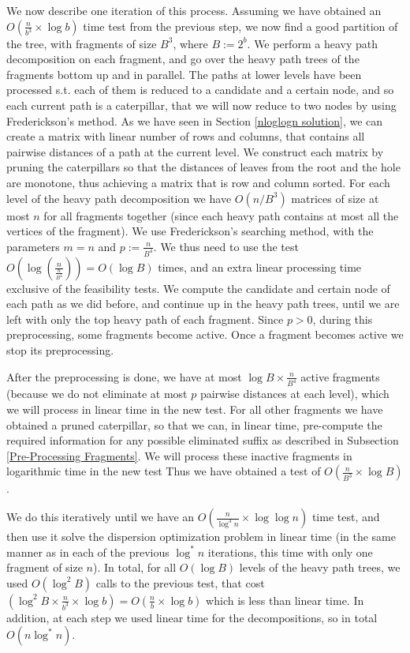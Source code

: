 \documentclass[11pt,a4paper]{article}
\theoremstyle{definition}
\theoremstyle{remark}
\begin{document}
We now describe one iteration of this process. Assuming we have obtained an $O(\frac{n}{b^3} \times \log b)$ time test from the previous step, we now find a good partition of the tree, with fragments of size $B^3$, where $B:=2^b$. We perform a heavy path decomposition on each fragment, and go over the heavy path trees of the fragments bottom up and in parallel. The paths at lower levels have been processed s.t. each of them is reduced to a candidate and a certain node, and so each current path is a caterpillar, that we will now reduce to two nodes by using Frederickson's method. As we have seen in Section \ref{nloglogn solution}, we can create a matrix with linear number of rows and columns, that contains all pairwise distances of a path at the current level. We construct each matrix by pruning the caterpillars so that the distances of leaves from the root and the hole are monotone, thus achieving a matrix that is row and column sorted. For each level of the heavy path decomposition we have $O(n/B^3)$ matrices of size at most $n$ for all fragments together (since each heavy path contains at most all the vertices of the fragment). We use Frederickson's searching method, with the parameters $m=n$ and $p:=\frac{n}{B^4}$. We thus need to use the test $O(\log (\frac{n}{\frac{n}{B^4}}))=O(\log B)$ times, and an extra linear processing time exclusive of the feasibility tests. We compute the candidate and certain node of each path as we did before, and continue up in the heavy path trees, until we are left with only the top heavy path of each fragment. Since $p>0$, during this preprocessing, some fragments become active. Once a fragment becomes active we stop its preprocessing.

After the preprocessing is done, we have at most $\log B \times \frac{n}{B^4}$ active fragments (because we do not eliminate at most $p$ pairwise distances at each level), which we will process in linear time in the new test. For all other fragments we have obtained a pruned caterpillar, so that we can, in linear time, pre-compute the required information for any possible eliminated suffix as described in Subsection \ref{Pre-Processing Fragments}. We will process these inactive fragments in logarithmic time in the new test Thus we have obtained a test of $O(\frac{n}{B^3} \times \log B)$.

We do this iteratively until we have an $O(\frac{n}{\log ^3n} \times \log \log n)$ time test, and then use it solve the dispersion optimization problem in linear time (in the same manner as in each of the previous $\log ^*n$ iterations, this time with only one fragment of size $n$). In total, for all $O(\log B)$ levels of the heavy path trees, we used $O(\log ^2B)$ calls to the previous test, that cost $(\log ^2B \times \frac{n}{b^3} \times \log b)=O(\frac{n}{b} \times \log b)$ which is less than linear time. In addition, at each step we used linear time for the decompositions, so in total $O(n \log ^*n)$. 
\end{document}
